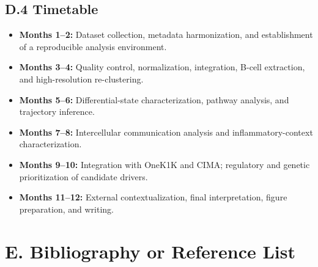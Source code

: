 \subsection*{D.4 Timetable}
\begin{itemize}
    \item \textbf{Months 1--2:} Dataset collection, metadata harmonization, and establishment of a reproducible analysis environment.
    \item \textbf{Months 3--4:} Quality control, normalization, integration, B-cell extraction, and high-resolution re-clustering.
    \item \textbf{Months 5--6:} Differential-state characterization, pathway analysis, and trajectory inference.
    \item \textbf{Months 7--8:} Intercellular communication analysis and inflammatory-context characterization.
    \item \textbf{Months 9--10:} Integration with OneK1K and CIMA; regulatory and genetic prioritization of candidate drivers.
    \item \textbf{Months 11--12:} External contextualization, final interpretation, figure preparation, and writing.
\end{itemize}

\newpage
\section*{E. Bibliography or Reference List}

